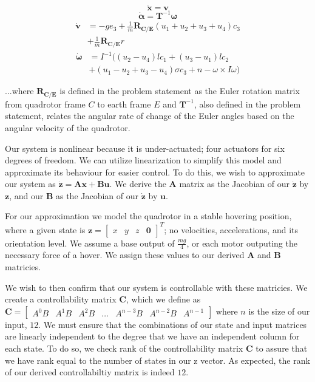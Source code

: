 \documentclass{article}
\begin{document}
\begin{multicols}{2}
\begin{equation}
    \mathbf{\dot{x}} =\mathbf{v}
\end{equation}
\begin{equation}
    \bm{\dot{\alpha}} =\mathbf{T}^{-1}\bm{\omega}
\end{equation}
\begin{align}
    \mathbf{\dot{v}} &=-ge_3+\frac{1}{m}\mathbf{R_{C/E}}(u_1+u_2+u_3+u_4)c_3 \nonumber\\ &+\frac{1}{m}\mathbf{R_{C/E}}r
\end{align}
\begin{align}
    \bm{\dot{\omega}} &=I^{-1}((u_2-u_4)lc_1+(u_3-u_1)lc_2 \nonumber\\ &+(u_1-u_2+u_3-u_4)\sigma c_3+n-\omega \times I \omega)
\end{align}

\noindent ...where $\mathbf{R_{C/E}}$ is defined in the problem statement as the Euler rotation matrix from quadrotor frame $C$ to earth frame $E$ and $\mathbf{T}^{-1}$, also defined in the problem statement, relates the angular rate of change of the Euler angles based on the angular velocity of the quadrotor.

Our system is nonlinear because it is under-actuated; four actuators for six degrees of freedom. We can utilize linearization to simplify this model and approximate its behaviour for easier control. To do this, we wish to approximate our system as $\boldsymbol{\dot{z}}=\boldsymbol{A}\boldsymbol{x}+\boldsymbol{B}\boldsymbol{u}$. We derive the $\boldsymbol{A}$ matrix as the Jacobian of our $\boldsymbol{\dot{z}}$ by $\boldsymbol{z}$, and our $\boldsymbol{B}$ as the Jacobian of our $\boldsymbol{\dot{z}}$ by $\boldsymbol{u}$. 

For our approximation we model the quadrotor in a stable hovering position, where a given state is $\boldsymbol{z}=\begin{bmatrix} 
x & y & z & \boldsymbol{0}\end{bmatrix}^T$; no velocities, accelerations, and its orientation level. We assume a base output of $
\frac{mg}{4}$, or each motor outputing the necessary force of a hover. We assign these values to our derived $\boldsymbol{A}$ and 
$\boldsymbol{B}$ matricies.

We wish to then confirm that our system is controllable with these matricies. We create a controllability matrix $\boldsymbol{C}$, 
which we define as $\boldsymbol{C} = \begin{bmatrix} A^0B & A^1B & A^2B & \dots & A^{n-3}B & A^{n-2}B & A^{n-1}\end{bmatrix}$ 
where $n$ is the size of our input, $12$. We must ensure that the combinations of our state and input matrices are linearly 
independent to the degree that we have an independent column for each state. To do so, we check rank of the controllability matrix $
\boldsymbol{C}$ to assure that we have rank equal to the number of states in our z vector. As expected, the rank of our derived 
controllabiltiy matrix is indeed $12$.


\end{multicols}
\end{document}
